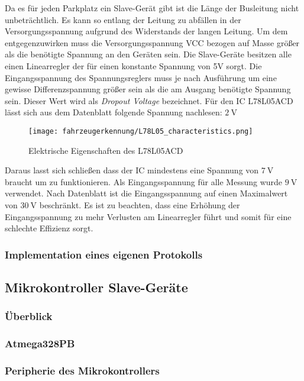 Da es für jeden Parkplatz ein Slave-Gerät gibt ist die Länge der Busleitung nicht unbeträchtlich. Es kann so entlang der Leitung zu abfällen in der Versorgungsspannung aufgrund des Widerstands der langen Leitung.
Um dem entgegenzuwirken muss die Versorgungsspannung VCC bezogen auf Masse größer als die benötigte Spannung an den Geräten sein. Die Slave-Geräte besitzen alle einen Linearregler der für einen konstante Spannung von 5V sorgt.
Die Eingangsspannung des Spannungsreglers muss je nach Ausführung um eine gewisse Differenzspannung größer sein als die am Ausgang benötigte Spannung sein. Dieser Wert wird als \textit{Dropout Voltage} bezeichnet. 
Für den IC L78L05ACD lässt sich aus dem Datenblatt folgende Spannung nachlesen: $\SI{2}{\volt}$

\begin{figure}[H]
    \centering
    \texttt{[image: fahrzeugerkennung/L78L05\_characteristics.png]}
    \caption{Elektrische Eigenschaften des L78L05ACD}
\end{figure}

Daraus lasst sich schließen dass der IC mindestens eine Spannung von $\SI{7}{\volt}$ braucht um zu funktionieren. Als Eingangsspannung für alle Messung wurde $\SI{9}{\volt}$ verwendet. Nach Datenblatt ist die Eingangsspannung auf 
einen Maximalwert von $\SI{30}{\volt}$ beschränkt. Es ist zu beachten, dass eine Erhöhung der Eingangsspannung zu mehr Verlusten am Linearregler führt und somit für eine schlechte Effizienz sorgt.

\subsubsection{Implementation eines eigenen Protokolls}

\subsection{Mikrokontroller Slave-Geräte}
\subsubsection{Überblick}
\subsubsection{Atmega328PB}
\subsubsection{Peripherie des Mikrokontrollers}
